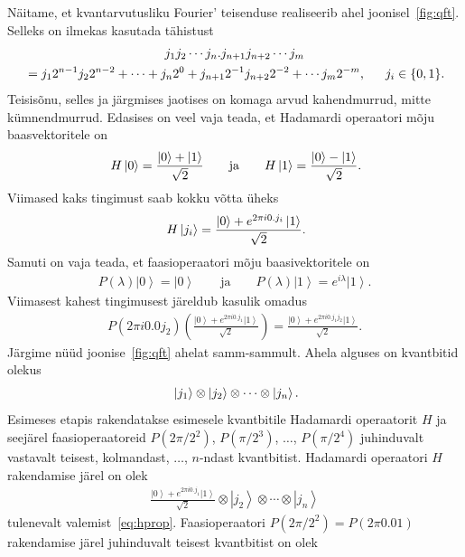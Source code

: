 \documentclass[12pt]{report}
\def\paren#1{\left(#1\right)}
\def\ket#1{\left|#1\right>}
\begin{document}
Näitame, et kvantarvutusliku Fourier' teisenduse realiseerib ahel joonisel~\ref{fig:qft}.
Selleks on ilmekas kasutada tähistust
\begin{multline}
    j_1j_2\cdots j_n.j_{n+1}j_{n+2}\cdots j_m \\
    = j_1 2^{n-1} j_2 2^{n-2} + \cdots + j_n 2^0 + j_{n+1} 2^{-1} j_{n+2} 2^{-2} + \cdots j_m 2^{-m} \rlap{,}
    \qquad j_i \in \{0, 1\} \rlap{.}
\end{multline}
Teisisõnu, selles ja järgmises jaotises on komaga arvud kahendmurrud, mitte kümnendmurrud.
Edasises on veel vaja teada, et Hadamardi operaatori mõju baasvektoritele on
\begin{align}
    H\ket{0} = \frac{\ket{0} + \ket{1}}{\sqrt{2}}
    \qquad\text{ja}\qquad
    H\ket{1} = \frac{\ket{0} - \ket{1}}{\sqrt{2}} \rlap{.}
\end{align}
Viimased kaks tingimust saab kokku võtta üheks
\begin{align}\label{eq:hprop}
    H\ket{j_i} = \frac{\ket{0} + e^{2\pi i0.j_i}\ket{1}}{\sqrt{2}}\rlap{.}
\end{align}
Samuti on vaja teada, et faasioperaatori mõju baasivektoritele on
\begin{align}
    P(\lambda)\ket{0} = \ket{0}
    \qquad\text{ja}\qquad
    P(\lambda)\ket{1} = e^{i\lambda}\ket{1} .
\end{align}
Viimasest kahest tingimusest järeldub kasulik omadus
\begin{align}\label{eq:phaseprop}
    P(2\pi i0.0j_2)\paren{\frac{\ket{0} + e^{2\pi i 0.j_1} \ket{1}}{\sqrt{2}}}
    = \frac{\ket{0}+e^{2\pi i0.j_1j_2}\ket{1}}{\sqrt{2}} .
\end{align}
Järgime nüüd joonise~\ref{fig:qft} ahelat samm-sammult.
Ahela alguses on kvantbitid olekus
\begin{align}
    \ket{j_1} \otimes \ket{j_2} \otimes \cdots \otimes \ket{j_n} \rlap{.}
\end{align}
Esimeses etapis rakendatakse esimesele kvantbitile Hadamardi operaatorit \(H\) ja seejärel faasioperaatoreid \(P(2\pi/2^2)\), \(P(\pi/2^3)\), \(\ldots\), \(P(\pi/2^4)\) juhinduvalt vastavalt teisest, kolmandast, \(\ldots\), \(n\)-ndast kvantbitist.
Hadamardi operaatori \(H\) rakendamise järel on olek
\begin{align}
    \frac{\ket{0} + e^{2\pi i0.j_1}\ket{1}}{\sqrt{2}} \otimes \ket{j_2} \otimes \cdots \otimes \ket{j_n}
\end{align}
tulenevalt valemist~\eqref{eq:hprop}.
Faasioperaatori \(P(2\pi/2^2) = P(2\pi0.01)\) rakendamise järel juhinduvalt teisest kvantbitist on olek
\end{document}
